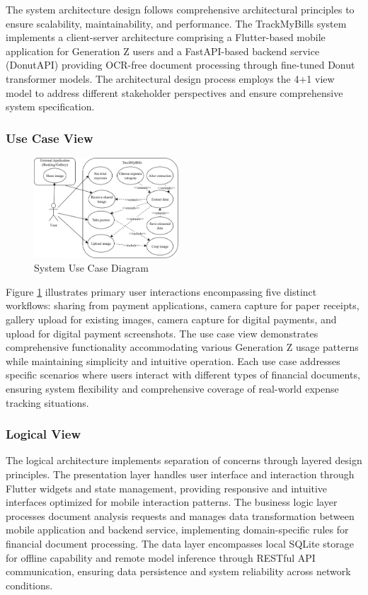 The system architecture design follows comprehensive architectural principles to ensure scalability, maintainability, and performance. The TrackMyBills system implements a client-server architecture comprising a Flutter-based mobile application for Generation Z users and a FastAPI-based backend service (DonutAPI) providing OCR-free document processing through fine-tuned Donut transformer models. The architectural design process employs the 4+1 view model to address different stakeholder perspectives and ensure comprehensive system specification.

\subsubsection{Use Case View}
\begin{figure}[htbp]
    \centering
    \includegraphics[width=0.48\textwidth]{images/use-case-eng.png}
    \caption{System Use Case Diagram}
    \label{fig:usecase}
\end{figure}

Figure \ref{fig:usecase} illustrates primary user interactions encompassing five distinct workflows: sharing from payment applications, camera capture for paper receipts, gallery upload for existing images, camera capture for digital payments, and upload for digital payment screenshots. The use case view demonstrates comprehensive functionality accommodating various Generation Z usage patterns while maintaining simplicity and intuitive operation. Each use case addresses specific scenarios where users interact with different types of financial documents, ensuring system flexibility and comprehensive coverage of real-world expense tracking situations.

\subsubsection{Logical View}
The logical architecture implements separation of concerns through layered design principles. The presentation layer handles user interface and interaction through Flutter widgets and state management, providing responsive and intuitive interfaces optimized for mobile interaction patterns. The business logic layer processes document analysis requests and manages data transformation between mobile application and backend service, implementing domain-specific rules for financial document processing. The data layer encompasses local SQLite storage for offline capability and remote model inference through RESTful API communication, ensuring data persistence and system reliability across network conditions.

